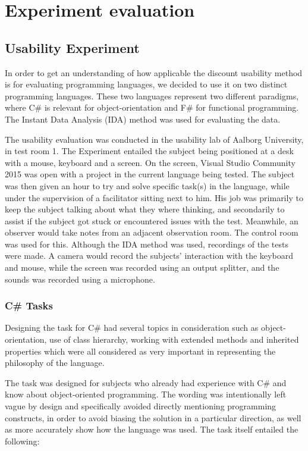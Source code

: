 \chapter{Experiment evaluation}
\label{chapter:ExperimenteEvaluation}
\section{Usability Experiment}
In order to get an understanding of how applicable the discount usability method is for evaluating programming languages, we decided to use it on two distinct programming languages. These two languages represent two different paradigms, where C\# is relevant for object-orientation and F\# for functional programming. The Instant Data Analysis (IDA) method\cite{IDA} was used for evaluating the data.

The usability evaluation was conducted in the usability lab of Aalborg University\cite{UsabilityLab}, in test room 1.
The Experiment entailed the subject being positioned at a desk with a mouse, keyboard and a screen.
On the screen, Visual Studio Community 2015 was open with a project in the current language being tested.
The subject was then given an hour to try and solve specific task(s) in the language, while under the supervision of a facilitator sitting next to him. His job was primarily to keep the subject talking about what they where thinking, and secondarily to assist if the subject got stuck or encountered issues with the test.
Meanwhile, an observer would take notes from an adjacent observation room. The control room was used for this.
Although the IDA method was used, recordings of the tests were made.
A camera would record the subjects' interaction with the keyboard and mouse, while the screen was recorded using an output splitter, and the sounds was recorded using a microphone.

\subsection{C\# Tasks}
\label{subsection:C Task}
Designing the task for C\# had several topics in consideration such as object-orientation, use of class hierarchy, working with extended methods and inherited properties which were all considered as very important in representing the philosophy of the language.  

The task was designed for subjects who already had experience with C\# and know about object-oriented programming.
The wording was intentionally left vague by design and specifically avoided directly mentioning programming constructs, in order to avoid biasing the solution in a particular direction, as well as more accurately show how the language was used. The task itself entailed the following:

